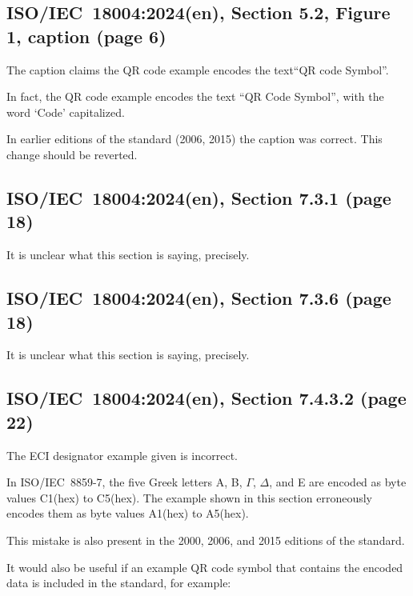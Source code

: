 \documentclass[a4paper,twoside]{article}
\newcommand{\shortstandard}{ISO/IEC~18004}
\newcommand{\standard}{\shortstandard:2024(en)}
\newcommand{\hex}[1]{#1(hex)}
\begin{document}
\subsection{\standard, Section 5.2, Figure 1, caption (page 6)}

The caption claims the QR code example encodes the text``QR code Symbol''.

In fact, the QR code example encodes the text ``QR Code Symbol'', with the word `Code' capitalized.

In earlier editions of the standard (2006, 2015) the caption was correct. This change should be reverted.

\subsection{\standard, Section 7.3.1 (page 18)}

It is unclear what this section is saying, precisely.

\subsection{\standard, Section 7.3.6 (page 18)}

It is unclear what this section is saying, precisely.

\subsection{\standard, Section 7.4.3.2 (page 22)}

The ECI designator example given is incorrect.

In ISO/IEC~8859-7, the five Greek letters A, B, $\Gamma$, $\Delta$, and E are encoded as byte values \hex{C1} to \hex{C5}.
The example shown in this section erroneously encodes them as byte values \hex{A1} to \hex{A5}.

This mistake is also present in the 2000, 2006, and 2015 editions of the standard.

It would also be useful if an example QR code symbol that contains the encoded data is included in the standard, for example:
\end{document}
